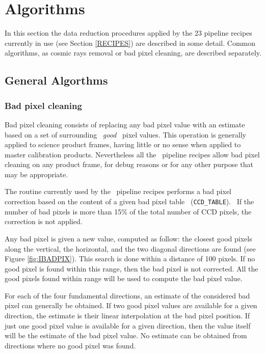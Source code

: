 \section{Algorithms}
\label{sec:ALGORITHMS}

In this section the data reduction procedures applied by the 23 pipeline
recipes currently in use (see Section \ref{RECIPES}) are described 
in some detail. Common algorithms, as cosmic rays removal
or bad pixel cleaning, are described separately.

\subsection{General Algorthms}

\subsubsection{Bad pixel cleaning}
\label{sec:ABADPIX}

Bad pixel cleaning consists of replacing any bad pixel value
with an estimate based on a set of surrounding \ {\it good} 
\ pixel values. This operation is generally applied to science 
product frames, having little or no sense when applied to master 
calibration products. Nevertheless all the \pipename\, pipeline recipes 
allow bad pixel cleaning on any product frame, for debug reasons 
or for any other purpose that may be appropriate.

The routine currently used by the \pipename\, pipeline recipes performs 
a bad pixel correction based on the content of a given bad pixel 
table \ ({\tt CCD\_TABLE}). \ If the number of bad pixels is more
than 15\% of the total number of CCD pixels, the correction is not
applied.


Any bad pixel is given a new value, computed as follow: the closest
good pixels along the vertical, the horizontal, and the two diagonal 
directions are found (see Figure \ref{fig:IBADPIX}). This search is
done within a distance of 100 pixels. If no good pixel is found
within this range, then the bad pixel is not corrected.
All the good pixels found within range will 
be used to compute the bad pixel value.

For each of the four fundamental directions, an estimate of the
considered bad pixel can generally be obtained. 
If two good pixel values are available for a given direction,
the estimate is their linear interpolation at the bad pixel position.
If just one good pixel value is available for a given direction, 
then the value itself will be the estimate of the bad pixel value.
No estimate can be obtained from directions where no good pixel
was found.

